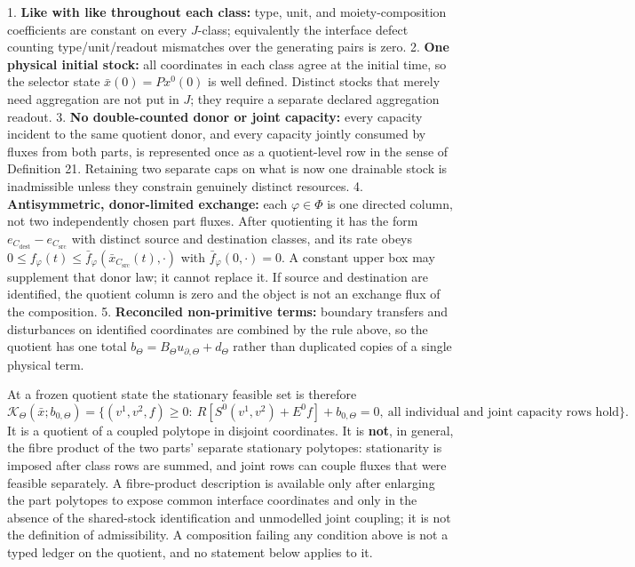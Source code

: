\documentclass[11pt]{article}
\begin{document}
1. \textbf{Like with like throughout each class:} type, unit, and moiety-composition coefficients are constant on every \(J\)-class; equivalently the interface defect counting type/unit/readout mismatches over the generating pairs is zero.
2. \textbf{One physical initial stock:} all coordinates in each class agree at the initial time, so the selector state \(\bar x(0)=Px^0(0)\) is well defined. Distinct stocks that merely need aggregation are not put in \(J\); they require a separate declared aggregation readout.
3. \textbf{No double-counted donor or joint capacity:} every capacity incident to the same quotient donor, and every capacity jointly consumed by fluxes from both parts, is represented once as a quotient-level row in the sense of Definition 21. Retaining two separate caps on what is now one drainable stock is inadmissible unless they constrain genuinely distinct resources.
4. \textbf{Antisymmetric, donor-limited exchange:} each \(\varphi\in\Phi\) is one directed column, not two independently chosen part fluxes. After quotienting it has the form \(e_{C_{\mathrm{dest}}}-e_{C_{\mathrm{src}}}\) with distinct source and destination classes, and its rate obeys \(0\le f_\varphi(t)\le\bar f_\varphi(\bar x_{C_{\mathrm{src}}}(t),\cdot)\) with \(\bar f_\varphi(0,\cdot)=0\). A constant upper box may supplement that donor law; it cannot replace it. If source and destination are identified, the quotient column is zero and the object is not an exchange flux of the composition.
5. \textbf{Reconciled non-primitive terms:} boundary transfers and disturbances on identified coordinates are combined by the rule above, so the quotient has one total \(b_\Theta=B_\Theta u_{\partial,\Theta}+d_\Theta\) rather than duplicated copies of a single physical term.

At a frozen quotient state the stationary feasible set is therefore
$$\mathcal K_\Theta(\bar x;b_{0,\Theta})=\{(v^1,v^2,f)\ge0:\ R[S^0(v^1,v^2)+E^0f]+b_{0,\Theta}=0,\ \text{all individual and joint capacity rows hold}\}.$$
It is a quotient of a coupled polytope in disjoint coordinates. It is \textbf{not}, in general, the fibre product of the two parts' separate stationary polytopes: stationarity is imposed after class rows are summed, and joint rows can couple fluxes that were feasible separately. A fibre-product description is available only after enlarging the part polytopes to expose common interface coordinates and only in the absence of the shared-stock identification and unmodelled joint coupling; it is not the definition of admissibility. A composition failing any condition above is not a typed ledger on the quotient, and no statement below applies to it.
\end{document}
